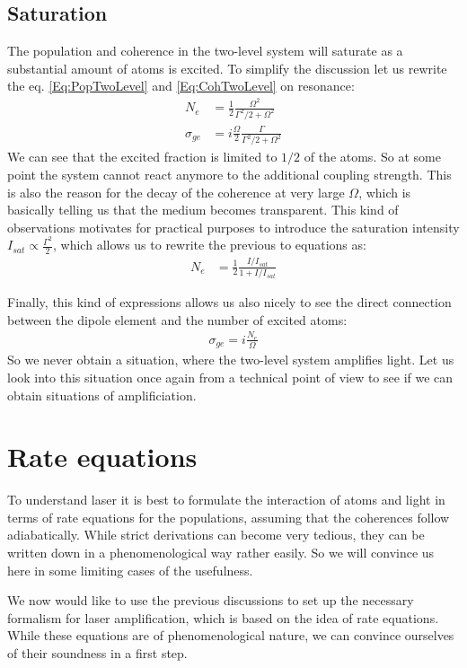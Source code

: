\documentclass[10pt]{article}
\begin{document}
\subsection{Saturation}
The population and coherence in the two-level system will saturate as a substantial amount of atoms is excited. To simplify the discussion let us rewrite the eq. \eqref{Eq:PopTwoLevel} and \eqref{Eq:CohTwoLevel} on resonance:
\begin{align}
N_e &= \frac{1}{2}\frac{\Omega^2}{\Gamma^2/2+\Omega^2}\\
\sigma_{ge} &= i\frac{\Omega}{2}\frac{\Gamma}{\Gamma^2/2+\Omega^2}
\end{align}
We can see that the excited fraction is limited to $1/2$ of the atoms. So at some point the system cannot react anymore to the additional coupling strength. This is also the reason for the decay of the coherence at very large $\Omega$, which is basically telling us that the medium becomes transparent. This kind of observations motivates for practical purposes to introduce the saturation intensity $I_{sat} \propto \frac{\Gamma^2}{2}$, which allows us to rewrite the previous to equations as:
\begin{align}
N_e &= \frac{1}{2}\frac{I/I_{sat}}{1+I/I_{sat}}
\end{align}

Finally, this kind of expressions allows us also nicely to see the direct connection between the dipole element and the number of excited atoms:
\begin{align}
\sigma_{ge} = i\frac{N_e}{\Omega}
\end{align}
So we never obtain a situation, where the two-level system amplifies light. Let us look into this situation once again from a technical point of view to see if we can obtain situations of amplificiation.

\section{Rate equations}
To understand laser it is best to formulate the interaction of atoms and light in terms of rate equations for the populations, assuming that the coherences follow adiabatically. While strict derivations can become very tedious, they can be written down in a phenomenological way rather easily. So we will convince us here in some limiting cases of the usefulness.

We now would like to use the previous discussions to set up the necessary formalism for laser amplification, which is based on the idea of rate equations. While these equations are of phenomenological nature, we can convince ourselves of their soundness in a first step.
\end{document}
